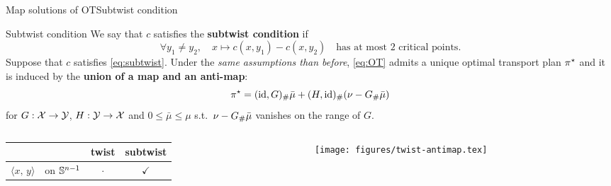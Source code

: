 \documentclass[9pt,xcolor={dvipsnames}]{beamer}
\begin{document}
\begin{frame}{Map solutions of OT}{Subtwist condition}
    \begin{block}{Subtwist condition }
        We say that $c$ satisfies the \textbf{subtwist condition} if
    \begin{equation}
        \tag{Subtwist}
        \forall y_1\neq y_2,\quad x\mapsto c(x,y_1)-c(x,y_2)\quad \text{has at most 2 critical points.}
        \label{eq:subtwist}
    \end{equation}
    Suppose that $c$ satisfies \cref{eq:subtwist}. Under the \emph{same assumptions than before}, \cref{eq:OT} admits a unique optimal transport plan $\pi^\star$ and it is induced by the \textbf{union of a map and an anti-map}:
    \begin{equation*}
        \pi^\star=(\operatorname{id} , G)_\# \bar\mu+(H, \operatorname{id})_\#(\nu-G_\# \bar\mu)
    \end{equation*}
    for $G:\mathcal{X}\to\mathcal{Y}$, $H: \mathcal{Y}\to\mathcal{X}$ and $0\leq\bar\mu \leq \mu$ s.t.~$\nu-G_\# \bar\mu$ vanishes on the range of $G$.
    \end{block}
    \begin{columns}
        \begin{column}{.7\textwidth}
                \begin{table}[h]
                    \raggedright
                    \begin{tabular}{ll|cc}
                                           &                &  twist        & subtwist  \\\hline
                    $\langle x,\,y\rangle$ & on $\mathbb{S}^{n-1}$ &  $\cdot$      & $\checkmark$
                    \end{tabular}
                \end{table}
        \end{column}
        \begin{column}{.3\textwidth}
            \begin{figure}
                \texttt{[image: figures/twist-antimap.tex]}
            \end{figure}
        \end{column}
    \end{columns}
\end{frame}
\end{document}
